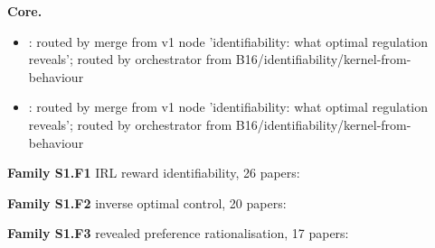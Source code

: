 \documentclass[10pt]{article}
\newcommand{\memb}[1]{\par\smallskip\textbf{#1}\quad}
\begin{document}
\memb{Core.}
\begin{itemize}[nosep,leftmargin=1.2em]
\item \citet{Geadah-inferring24}: routed by merge from v1 node 'identifiability: what optimal regulation reveals'; routed by orchestrator from B16/identifiability/kernel-from-behaviour
\item \citet{Yu-joint26}: routed by merge from v1 node 'identifiability: what optimal regulation reveals'; routed by orchestrator from B16/identifiability/kernel-from-behaviour
\end{itemize}
\memb{Family S1.F1} IRL reward identifiability, 26 papers: {\footnotesize \citetext{\citealp{Ng-algorithms00}; \citealp{Cao-identifiability21}; \citealp{Skalse-invariance22}; \citealp{Lazzati-learning24}; \citealp{Ng-policy99}; \citealp{Amin-towards16}; \citealp{Amin-repeated17}; \citealp{Armstrong-occams17}; \citealp{Singh-risksensitive17}; \citealp{Gong-what20}; \citealp{Pattanayak-necessary20}; \citealp{Viano-robust20}; \citealp{Kim-reward21}; \citealp{Jenner-calculus22}; \citealp{Rolland-identifiability22}; \citealp{Skalse-misspecification22}; \citealp{Metelli-towards23}; \citealp{Schlaginhaufen-identifiability23}; \citealp{Skalse-partial24}; \citealp{Skalse-partialnonexp24}; \citealp{Yao-inverse24}; \citealp{Belomestny-statistical25}; \citealp{Lazzati-reward25}; \citealp{Lazzati-robustness25}; \citealp{Shehab-efficient25}; \citealp{Kim-inverse26}}}

\memb{Family S1.F2} inverse optimal control, 20 papers: {\footnotesize \citetext{\citealp{Geadah-inferring24}; \citealp{Kalman-when64}; \citealp{Yokoyama-inverse72}; \citealp{Jameson-inverse73}; \citealp{Moylan-nonlinear73}; \citealp{Dvijotham-inverse10}; \citealp{Keshavarz-imputing11}; \citealp{Priess-solutions15}; \citealp{Pauwels-linear16}; \citealp{Jean-inverse18}; \citealp{Jin-inverse18}; \citealp{Jean-injectivity19}; \citealp{Zhang-inverse19}; \citealp{AbAzar-inverse20}; \citealp{Li-identifiability21}; \citealp{Molloy-inverse22}; \citealp{Jean-inverse24}; \citealp{FernandezAyala-estimating25}; \citealp{Islam-uniqueness25}; \citealp{Cheng-datadriven26}}}

\memb{Family S1.F3} revealed preference rationalisation, 17 papers: {\footnotesize \citetext{\citealp{Afriat-construction67}; \citealp{Forges-afriats09}; \citealp{Heufer-quasiconcave13}; \citealp{Cherchye-revealed14}; \citealp{Krishnamurthy-inverse25}; \citealp{Varian-nonparametric82}; \citealp{Matzkin-axioms91}; \citealp{ForgesIehle-essential13}; \citealp{PolissonQuah-revealed13}; \citealp{CosaertDemuynck-revealed15}; \citealp{ForgesIehle-afriats14}; \citealp{Reny-characterization15}; \citealp{Halevy-nonparametric17}; \citealp{Hoiles-rationally19}; \citealp{Krishnamurthy-identifying20}; \citealp{Chambers-recovering21}; \citealp{HuetVaughn-kinky24}}}
\end{document}
